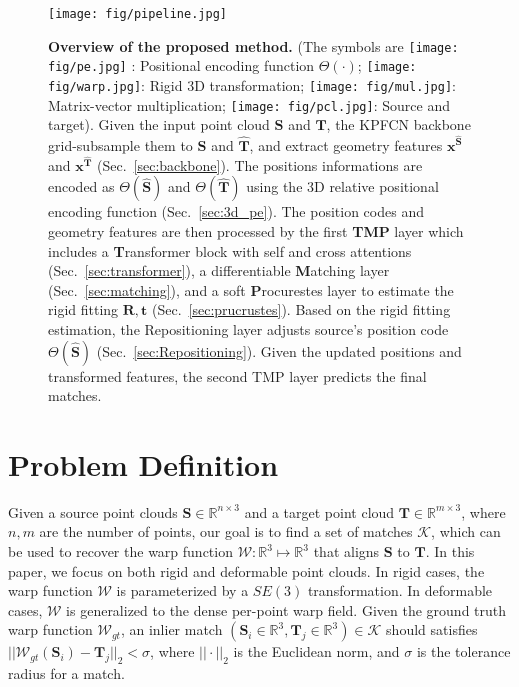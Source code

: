 \begin{figure*}
    \centering
    \texttt{[image: fig/pipeline.jpg]}
    \caption{
\textbf{Overview of the proposed method.}
(The symbols are 
\texttt{[image: fig/pe.jpg]} 
: Positional encoding function $\Theta(\cdot)$;
\texttt{[image: fig/warp.jpg]}: 
Rigid 3D transformation;
\texttt{[image: fig/mul.jpg]}: 
Matrix-vector multiplication;
\texttt{[image: fig/pcl.jpg]}: 
Source and target).
Given the input point cloud $\mathbf{S}$ and $\mathbf{T}$, the KPFCN backbone grid-subsample them to $\mathbf{\hat{S}}$ and $\hat{\mathbf{T}}$, and extract geometry features $\mathbf{x}^\mathbf{\hat{S}}$ and $\mathbf{x}^\mathbf{\hat{T}}$ (Sec.~\ref{sec:backbone}). 
The positions informations are encoded as $\Theta (\mathbf{\hat{S}})$ and $\Theta (\mathbf{\hat{T}})$ using the 3D relative positional encoding function (Sec.~\ref{sec:3d_pe}).
The position codes and geometry features are then processed by the first \textbf{TMP} layer which includes a \textbf{T}ransformer block with self and cross attentions (Sec.~\ref{sec:transformer}), a differentiable \textbf{M}atching layer (Sec.~\ref{sec:matching}), and a soft \textbf{P}rocurestes layer to estimate the rigid fitting $\mathbf{R,t}$ (Sec.~\ref{sec:prucrustes}).  Based on the rigid fitting estimation, the Repositioning layer adjusts source's position code $\Theta (\mathbf{\hat{S}})$ (Sec.~\ref{sec:Repositioning}). Given the updated positions and transformed features, the second TMP layer predicts the final matches. }
    \label{fig:pipeline}
\end{figure*}

\section{Problem Definition}
Given a source point clouds $\mathbf{S} \in \mathbb{R}^{n\times3}$ and a target point cloud $\mathbf{T} \in \mathbb{R}^{m\times3}$, where $n,m$ are the number of points, 
our goal is to find a set of matches $\mathcal{K}$, which can be used to recover the warp function $\mathcal{W}: \mathbb{R}^3 \mapsto \mathbb{R}^3$ that aligns $\mathbf{S}$ to $\mathbf{T}$. 
In this paper, we focus on both rigid and deformable point clouds.
In rigid cases, the warp function $\mathcal{W}$ is parameterized by a $ SE(3)$ transformation.
In deformable cases, $\mathcal{W}$ is generalized to the dense per-point warp field.
Given the ground truth warp function $\mathcal{W}_{gt}$,
an inlier match $(\mathbf{S}_i\in \mathbb{R}^3, \mathbf{T}_j \in \mathbb{R}^3)\in \mathcal{K}$ should satisfies 
$
||\mathcal{W}_{gt}(\mathbf{S}_i) - \mathbf{T}_j ||_2  < \sigma
$,
where $||\cdot||_2$ is the Euclidean norm, and $\sigma$ is the tolerance radius for a match. 

